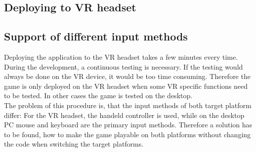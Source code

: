 \subsection{Deploying to VR headset}
\subsection{Support of different input methods}
\label{inputmethods}
Deploying the application to the VR headset takes a few minutes every time. During the development, a continuous testing is necessary. If the testing would always be done on the VR device, it would be too time consuming. Therefore the game is only deployed on the VR headset when some VR specific functions need to be tested. In other cases the game is tested on the desktop. \\
The problem of this procedure is, that the input methods of both target platform differ: For the VR headset, the handeld controller is used, while on the desktop PC mouse and keyboard are the primary input methods. Therefore a solution has to be found, how to make the game playable on both platforms without changing the code when switching the target platforms.

